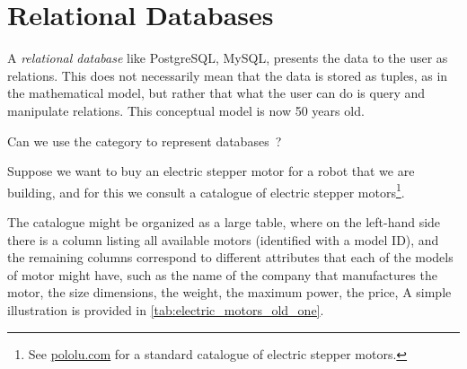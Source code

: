 
\section{Relational Databases}
\label{sec:relational-databases}

A \emph{relational database} like PostgreSQL, MySQL, \etc presents the data to the user as relations.
This does not necessarily mean that the data is stored as tuples, as in the mathematical model, but rather that what the user can do is query and manipulate relations.
This conceptual model is now 50 years old.

Can we use the category \Rel to represent databases~\cite{codd2002relational}?

Suppose we want to buy an electric stepper motor for a robot that we are building, and for this we consult a catalogue of electric stepper motors\footnote{See \href{https://www.pololu.com/category/87/stepper-motors}{pololu.com} for a standard catalogue of electric stepper motors.
}.

The catalogue might be organized as a large table, where on the left-hand side there is a column listing all available motors (identified with a model ID), and the remaining columns correspond to different attributes that each of the models of motor might have, such as the name of the company that manufactures the motor, the size dimensions, the weight, the maximum power, the price, \etc
A simple illustration is provided in \cref{tab:electric_motors_old_one}.

